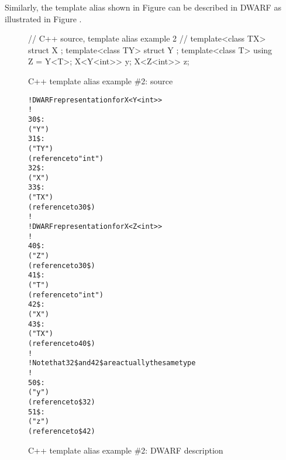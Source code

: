 \vspace*{0.7\baselineskip}
Similarly, the  template alias shown in
Figure 
can be described in DWARF as illustrated 
 in 
Figure .

\begin{figure}[ht]
\begin{nlnlisting}
// C++ source, template alias example 2
//
template<class TX> struct X { };
template<class TY> struct Y { };
template<class T> using Z = Y<T>;
X<Y<int>> y;
X<Z<int>> z;
\end{nlnlisting}
\caption{C++ template alias example \#2: source}
\label{fig:ctemplatealiasexample2source}
\end{figure}

\begin{figure}[ht]
\begin{dwflisting}
\begin{alltt}
! DWARF representation for X<Y<int>>
!
30\$:  \DWTAGstructuretype
          \DWATname("Y")
31\$:      \DWTAGtemplatetypeparameter
              \DWATname("TY")
              \DWATtype(reference to "int")
32\$:  \DWTAGstructuretype
          \DWATname("X")
33\$:      \DWTAGtemplatetypeparameter
              \DWATname("TX")
              \DWATtype(reference to 30\$)
!
! DWARF representation for X<Z<int>>
!
40\$:  \DWTAGtemplatealias
          \DWATname("Z")
          \DWATtype(reference to 30\$)
41\$:      \DWTAGtemplatetypeparameter
              \DWATname("T")
              \DWATtype(reference to "int")
42\$:  \DWTAGstructuretype
          \DWATname("X")
43\$:      \DWTAGtemplatetypeparameter
              \DWATname("TX")
              \DWATtype(reference to 40\$)
!
! Note that 32\$ and 42\$ are actually the same type
!
50\$:  \DWTAGvariable
          \DWATname("y")
          \DWATtype(reference to \$32)
51\$:  \DWTAGvariable
          \DWATname("z")
          \DWATtype(reference to \$42)
\end{alltt}
\end{dwflisting}
\caption{C++ template alias example \#2: DWARF description}
\label{fig:ctemplatealiasexample2dwarf}
\end{figure}

\clearpage
